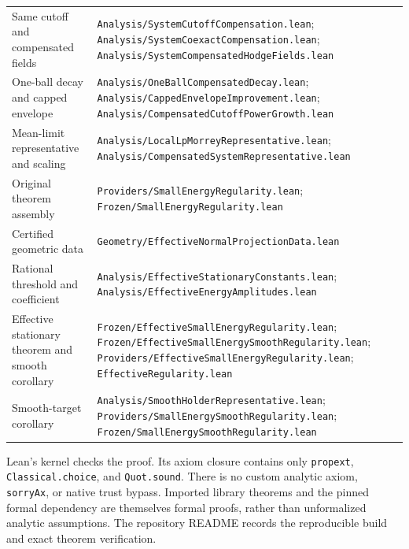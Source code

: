 \documentclass[11pt,a4paper]{article}
\numberwithin{equation}{section}
\theoremstyle{definition}
\theoremstyle{remark}
\newcommand{\lean}[1]{\nolinkurl{#1}}
\begin{document}
\begin{longtable}{@{}>{\raggedright\arraybackslash}p{}>{\raggedright\arraybackslash}p{}@{}}
Same cutoff and compensated fields &
\lean{Analysis/SystemCutoffCompensation.lean};\newline
\lean{Analysis/SystemCoexactCompensation.lean};\newline
\lean{Analysis/SystemCompensatedHodgeFields.lean}\\
One-ball decay and capped envelope &
\lean{Analysis/OneBallCompensatedDecay.lean};\newline
\lean{Analysis/CappedEnvelopeImprovement.lean};\newline
\lean{Analysis/CompensatedCutoffPowerGrowth.lean}\\
Mean-limit representative and scaling &
\lean{Analysis/LocalLpMorreyRepresentative.lean};\newline
\lean{Analysis/CompensatedSystemRepresentative.lean}\\
Original theorem assembly &
\lean{Providers/SmallEnergyRegularity.lean};\newline
\lean{Frozen/SmallEnergyRegularity.lean}\\
Certified geometric data &
\lean{Geometry/EffectiveNormalProjectionData.lean}\\
Rational threshold and coefficient &
\lean{Analysis/EffectiveStationaryConstants.lean};\newline
\lean{Analysis/EffectiveEnergyAmplitudes.lean}\\
Effective stationary theorem and smooth corollary &
\lean{Frozen/EffectiveSmallEnergyRegularity.lean};\newline
\lean{Frozen/EffectiveSmallEnergySmoothRegularity.lean};\newline
\lean{Providers/EffectiveSmallEnergyRegularity.lean};\newline
\lean{EffectiveRegularity.lean}\\
Smooth-target corollary &
\lean{Analysis/SmoothHolderRepresentative.lean};\newline
\lean{Providers/SmallEnergySmoothRegularity.lean};\newline
\lean{Frozen/SmallEnergySmoothRegularity.lean}\\
\bottomrule
\end{longtable}
\normalsize

Lean's kernel checks the proof. Its axiom closure contains only
\lean{propext}, \lean{Classical.choice}, and \lean{Quot.sound}.
There is no custom analytic axiom, \lean{sorryAx}, or native trust
bypass. Imported library theorems and the pinned formal dependency
are themselves formal proofs, rather than unformalized analytic
assumptions. The repository README records the reproducible build
and exact theorem verification.
\end{document}

